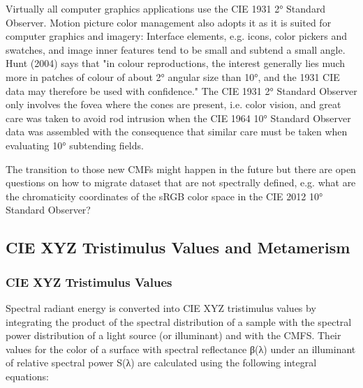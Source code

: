Virtually all computer graphics applications use the CIE 1931 2° Standard Observer. Motion picture color management also adopts it as it is suited for computer graphics and imagery:
Interface elements, e.g. icons, color pickers and swatches, and image inner features tend to be small and subtend a small angle. Hunt (2004) says that "in colour reproductions, the interest generally lies much more in patches of colour of about 2° angular size than 10°, and the 1931 CIE data may therefore be used with confidence."
The CIE 1931 2° Standard Observer only involves the fovea where the cones are present, i.e. color vision, and great care was taken to avoid rod intrusion when the CIE 1964 10° Standard Observer data was assembled with the consequence that similar care must be taken when evaluating 10° subtending fields.

The transition to those new CMFs might happen in the future but there are open questions on how to migrate dataset that are not spectrally defined, e.g. what are the chromaticity coordinates of the sRGB color space in the CIE 2012 10° Standard Observer?

\subsection{CIE XYZ Tristimulus Values and Metamerism}%
\label{subsec:cie-xyz-tristimulus-values-and-metamerism}

\subsubsection{CIE XYZ Tristimulus Values}%
\label{subsubsec:cie-xyz-tristimulus-values}

Spectral radiant energy is converted into CIE XYZ tristimulus values by integrating the product of the spectral distribution of a sample with the spectral power distribution of a light source (or illuminant) and with the CMFS. Their values for the color of a surface with spectral reflectance β(λ) under an illuminant of relative spectral power S(λ) are calculated using the following integral equations:


